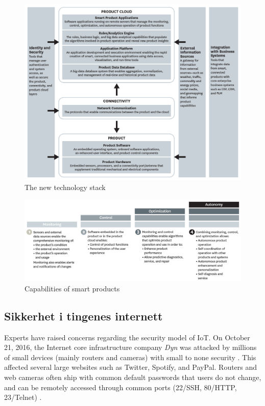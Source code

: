 \begin{figure}
\includegraphics[width=1.1\textwidth,center]{fig/harvard_technology}
\caption{The new technology stack \citep{iot_harvard_smart}}
\label{fig:iot_harvard_smart}
\end{figure}

\begin{figure}
\includegraphics[width=1.1\textwidth,center]{fig/harvard_capabilities}
\caption{Capabilities of smart products \citep{iot_harvard_smart}}
\label{fig:iot_harvard_capabilities}
\end{figure}


\subsection{Sikkerhet i tingenes internett}
Experts have raised concerns regarding the security model of IoT. On October 21, 2016, the Internet core
infrastructure company \textit{Dyn} was attacked by millions of small devices (mainly routers and cameras)
with small to none security \citep{iot_attack_ddos}. This affected several large websites such as Twitter,
Spotify, and PayPal. Routers and web cameras often ship with common default passwords that users
do not change, and can be remotely accessed through common ports (22/SSH, 80/HTTP, 23/Telnet)
\citep{iot_mirai_botnet}. 

